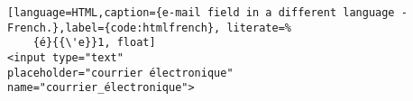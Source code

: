
\begin{lstlisting}[language=HTML,caption={e-mail field in a different language - French.},label={code:htmlfrench}, literate=%
	{é}{{\'e}}1, float]
<input type="text" 
placeholder="courrier électronique"
name="courrier_électronique">
\end{lstlisting}
